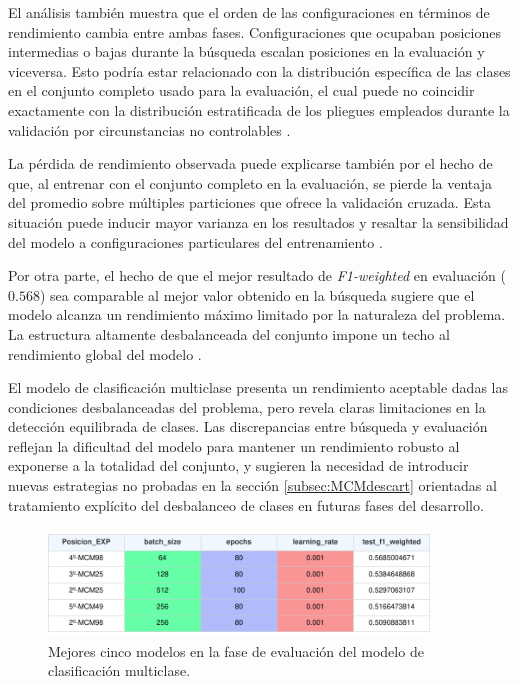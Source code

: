 El análisis también muestra que el orden de las configuraciones en términos de rendimiento cambia entre ambas fases. Configuraciones que ocupaban posiciones intermedias o bajas durante la búsqueda escalan posiciones en la evaluación y viceversa. Esto podría estar relacionado con la distribución específica de las clases en el conjunto completo usado para la evaluación, el cual puede no coincidir exactamente con la distribución estratificada de los pliegues empleados durante la validación por circunstancias no controlables \cite{buda2018systematic}.

La pérdida de rendimiento observada puede explicarse también por el hecho de que, al entrenar con el conjunto completo en la evaluación, se pierde la ventaja del promedio sobre múltiples particiones que ofrece la validación cruzada. Esta situación puede inducir mayor varianza en los resultados y resaltar la sensibilidad del modelo a configuraciones particulares del entrenamiento \cite{dietterich1998approx}.

Por otra parte, el hecho de que el mejor resultado de \textit{F1-weighted} en evaluación ($0{.}568$) sea comparable al mejor valor obtenido en la búsqueda sugiere que el modelo alcanza un rendimiento máximo limitado por la naturaleza del problema. La estructura altamente desbalanceada del conjunto impone un techo al rendimiento global del modelo \cite{japkowicz2002class}.

El modelo de clasificación multiclase presenta un rendimiento aceptable dadas las condiciones desbalanceadas del problema, pero revela claras limitaciones en la detección equilibrada de clases. Las discrepancias entre búsqueda y evaluación reflejan la dificultad del modelo para mantener un rendimiento robusto al exponerse a la totalidad del conjunto, y sugieren la necesidad de introducir nuevas estrategias no probadas en la sección \ref{subsec:MCMdescart}  orientadas al tratamiento explícito del desbalanceo de clases en futuras fases del desarrollo.

\begin{figure}[H]
    \centering
    \includegraphics[width=0.9\textwidth]{./img/evaluacion/resultados/top5EVALMCM.pdf}
    \caption{Mejores cinco modelos en la fase de evaluación del modelo de clasificación multiclase.}
    \label{fig:top5EVALMCM}
\end{figure}

